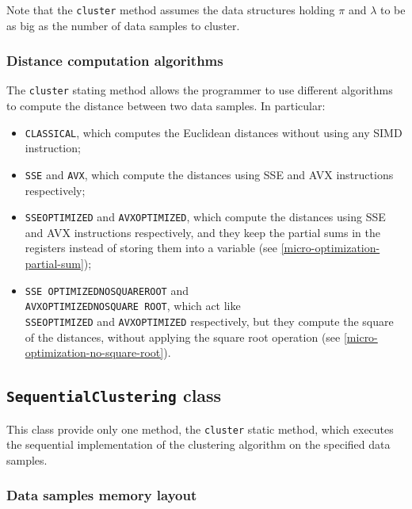 \documentclass{article}
\begin{document}
Note that the \texttt{cluster} method assumes the data structures holding $\pi$ and
$\lambda$ to be as big as the number of data samples to cluster.

\hypertarget{distance-computation-algorithms}{
\subsubsection{Distance computation algorithms}
\label{distance-computation-algorithms}}

The \texttt{cluster} stating method allows the programmer to use different algorithms to compute
the distance between two data samples. In particular:
\begin{itemize}
\item \texttt{CLASSICAL}, which computes the Euclidean distances without using any SIMD
instruction;
\item \texttt{SSE} and \texttt{AVX}, which compute the distances using SSE and AVX
instructions respectively;
\item \texttt{SSE\textunderscore OPTIMIZED} and \texttt{AVX\textunderscore OPTIMIZED}, which
compute the distances using
SSE and AVX instructions respectively, and they keep the partial sums in the registers
instead of storing them into a variable (see
\ref{micro-optimization-partial-sum});
\item \texttt{SSE\textunderscore
OPTIMIZED\textunderscore NO\textunderscore SQUARE\textunderscore ROOT} and\\
\texttt{AVX\textunderscore OPTIMIZED\textunderscore NO\textunderscore SQUARE\textunderscore
ROOT}, which act like\\ \texttt{SSE\textunderscore OPTIMIZED} and
\texttt{AVX\textunderscore OPTIMIZED} respectively, but they compute the square of the distances,
without applying the square root operation (see \ref{micro-optimization-no-square-root}).
\end{itemize}

\hypertarget{sequential-clustering}{
\subsection{\texttt{SequentialClustering} class}
\label{sequential-clustering}}

This class provide only one method, the \texttt{cluster} static method, which executes the
sequential implementation of the clustering algorithm on the specified data samples.

\hypertarget{seq-data-samples-layout}{
\subsubsection{Data samples memory layout}
\label{seq-data-samples-layout}}
\end{document}
